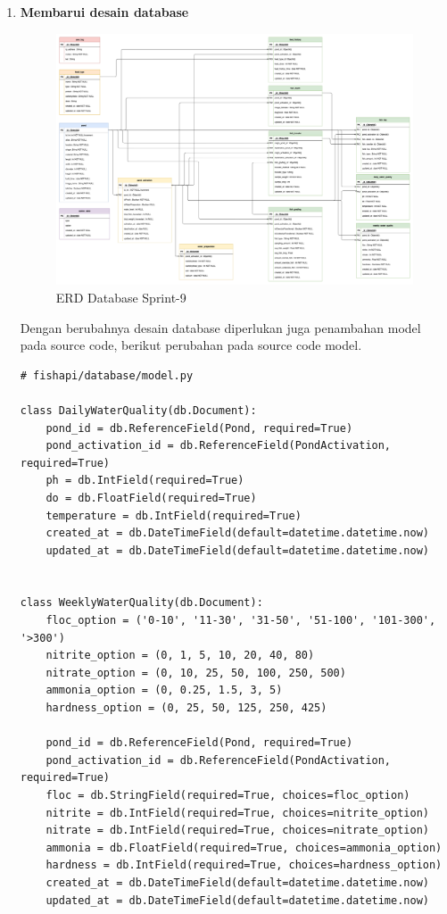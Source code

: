 \begin{enumerate}[1.]

\item \textbf{Membarui desain database}

\begin{figure}[H]
	\centering
	\includegraphics[height=0.7\textwidth]{gambar/Sprint09/diagram database/database}
	\caption{ERD Database Sprint-9}
	\label{fig:database_sprint9}
\end{figure}

Dengan berubahnya desain database diperlukan juga penambahan model pada source code, berikut perubahan pada source code model.

\begin{lstlisting}
# fishapi/database/model.py

class DailyWaterQuality(db.Document):
    pond_id = db.ReferenceField(Pond, required=True)
    pond_activation_id = db.ReferenceField(PondActivation, required=True)
    ph = db.IntField(required=True)
    do = db.FloatField(required=True)
    temperature = db.IntField(required=True)
    created_at = db.DateTimeField(default=datetime.datetime.now)
    updated_at = db.DateTimeField(default=datetime.datetime.now)


class WeeklyWaterQuality(db.Document):
    floc_option = ('0-10', '11-30', '31-50', '51-100', '101-300', '>300')
    nitrite_option = (0, 1, 5, 10, 20, 40, 80)
    nitrate_option = (0, 10, 25, 50, 100, 250, 500)
    ammonia_option = (0, 0.25, 1.5, 3, 5)
    hardness_option = (0, 25, 50, 125, 250, 425)

    pond_id = db.ReferenceField(Pond, required=True)
    pond_activation_id = db.ReferenceField(PondActivation, required=True)
    floc = db.StringField(required=True, choices=floc_option)
    nitrite = db.IntField(required=True, choices=nitrite_option)
    nitrate = db.IntField(required=True, choices=nitrate_option)
    ammonia = db.FloatField(required=True, choices=ammonia_option)
    hardness = db.IntField(required=True, choices=hardness_option)
    created_at = db.DateTimeField(default=datetime.datetime.now)
    updated_at = db.DateTimeField(default=datetime.datetime.now)
\end{lstlisting}




\end{enumerate}
